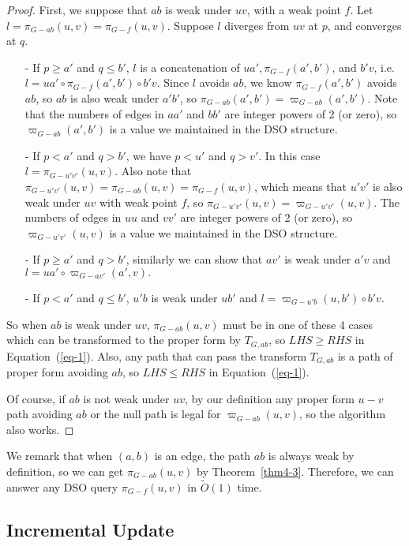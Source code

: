 \documentclass[11pt]{article}
\theoremstyle{plain}
\theoremstyle{definition}
\newcommand{\too}[1]{\tilde{O}({#1})}
\newcommand{\og}[3]{\pi_{G-#3}\left(#1,#2\right)}
\newcommand{\odg}[3]{\varpi_{G-#3}\left(#1,#2\right)}
\begin{document}
\begin{proof}


First, we suppose that $ab$ is weak under $uv$, with a weak point $f$. Let $l=\og{u}{v}{ab}=\og{u}{v}{f}.$ Suppose $l$ diverges from $uv$ at $p$, and converges at $q.$ 
\begin{itemize}
    \item[-] If $p\ge a'$ and $q\le b'$, $l$ is a concatenation of $ua', \og{a'}{b'}{f}$, and $b'v$, i.e. $l=ua'\circ \og{a'}{b'}{f}\circ b'v.$ Since $l$ avoids $ab$, we know $\og{a'}{b'}{f}$ avoids $ab$, so $ab$ is also weak under $a'b'$, so $\og{a'}{b'}{ab}=\odg{a'}{b'}{ab}.$ Note that the numbers of edges in $aa'$ and $bb'$ are integer powers of 2 (or zero), so $\odg{a'}{b'}{ab}$ is a value we maintained in the DSO structure.
    \item[-] If $p<a'$ and $q>b'$, we have $p<u'$ and $q>v'.$ In this case $l=\og{u}{v}{u'v'}.$ Also note that $\og{u}{v}{u'v'}=\og{u}{v}{ab}=\og{u}{v}{f}$, which means that $u'v'$ is also weak under $uv$ with weak point $f$, so $\og{u}{v}{u'v'}=\odg{u}{v}{u'v'}.$ The numbers of edges in $uu$ and $vv'$ are integer powers of 2 (or zero), so $\odg{u}{v}{u'v'}$ is a value we maintained in the DSO structure.
    \item[-] If $p\ge a'$ and $q>b'$, similarly we can show that $av'$ is weak under $a'v$ and $l=ua'\circ \odg{a'}{v}{av'}.$
    \item[-] If $p<a'$ and $q\le b'$, $u'b$ is weak under $ub'$ and $l=\odg{u}{b'}{u'b}\circ b'v.$
\end{itemize}
 
So when $ab$ is weak under $uv$, $\og{u}{v}{ab}$ must be in one of these 4 cases which can be transformed to the proper form by $T_{G,ab}$, so $LHS \geq RHS$ in Equation~(\ref{eq-1}). Also, any path that can pass the transform $T_{G,ab}$ is a path of proper form avoiding $ab$, so $LHS \leq RHS$ in Equation~(\ref{eq-1}).



Of course, if $ab$ is not weak under $uv$, by our definition any proper form $u-v$ path avoiding $ab$ or the null path is legal for $\odg{u}{v}{ab}$, so the algorithm also works. 
\end{proof}

We remark that when $(a,b)$ is an edge, the path $ab$ is always weak by definition, so we can get $\og{u}{v}{ab}$ by Theorem~\ref{thm4-3}. Therefore, we can answer any DSO query $\og{u}{v}{f}$ in $\too{1}$ time.

\subsection{Incremental Update}\label{sec4-3}
\end{document}
